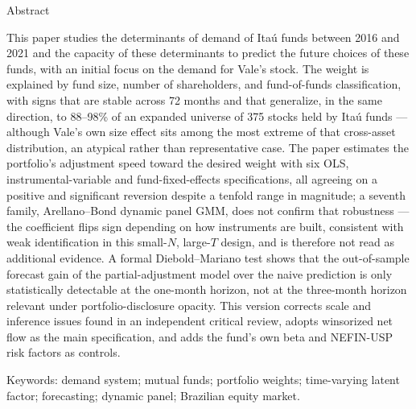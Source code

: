 \documentclass[12pt,a4paper]{article}
\begin{document}
\bigskip
\begin{center}{\large Abstract}\end{center}
\noindent
This paper studies the determinants of demand of Itaú funds between 2016 and 2021 and the
capacity of these determinants to predict the future choices of these funds, with an initial
focus on the demand for Vale's stock. The weight is explained by fund size, number of
shareholders, and fund-of-funds classification, with signs that are stable across 72 months and
that generalize, in the same direction, to 88--98\% of an expanded universe of 375 stocks
held by Itaú funds --- although Vale's own size effect sits among the most extreme of that
cross-asset distribution, an atypical rather than representative case. The paper estimates the
portfolio's adjustment speed toward the desired weight with six OLS, instrumental-variable and
fund-fixed-effects specifications, all agreeing on a positive and significant reversion despite a
tenfold range in magnitude; a seventh family, Arellano--Bond dynamic panel GMM, does not confirm
that robustness --- the coefficient flips sign depending on how instruments are built, consistent
with weak identification in this small-$N$, large-$T$ design, and is therefore not read as
additional evidence. A formal Diebold--Mariano test shows that the out-of-sample forecast gain of
the partial-adjustment model over the naive prediction is only statistically detectable at the
one-month horizon, not at the three-month horizon relevant under portfolio-disclosure opacity.
This version corrects scale and inference issues found in an independent critical review, adopts
winsorized net flow as the main specification, and adds the fund's own beta and NEFIN-USP risk
factors as controls.

\smallskip
\noindent Keywords: demand system; mutual funds; portfolio weights; time-varying latent factor;
forecasting; dynamic panel; Brazilian equity market.

\newpage
\thispagestyle{fancy}
\tableofcontents
\newpage

\end{document}
